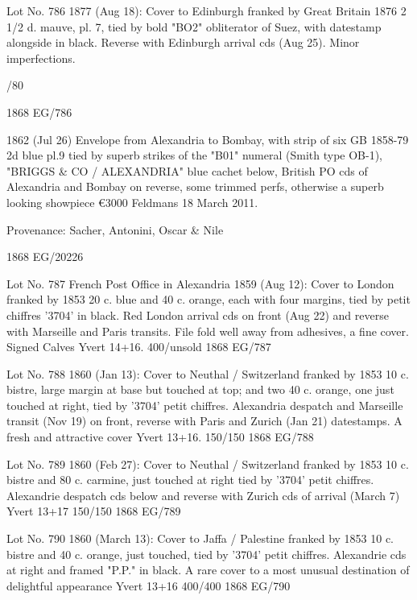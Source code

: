 \documentclass[justified]{tufte-book}
\begin{document}
%
{Lot No. 786
1877 (Aug 18): Cover to Edinburgh franked by Great Britain 1876 2 1/2 d. mauve, pl. 7, tied by bold "BO2" obliterator of Suez, with datestamp alongside in black. Reverse with Edinburgh arrival cds (Aug 25). Minor imperfections. 

/80 
}%
{1868}%
{EG/786}%
{}%
{}
{}%
{}


%
{1862 (Jul 26) Envelope from Alexandria to Bombay, with strip of six GB 1858-79 2d blue pl.9 tied by superb strikes of the "B01" numeral (Smith type OB-1), "BRIGGS \& CO / ALEXANDRIA" blue cachet below, British PO cds of Alexandria and Bombay on reverse, some trimmed perfs, otherwise a superb looking showpiece \euro 3000 Feldmans 18 March 2011.

Provenance: Sacher, Antonini, Oscar \& Nile
}%
{1868}%
{EG/20226}%
{}%
{}
{}%
{}


%
{Lot No. 787
French Post Office in Alexandria 1859 (Aug 12): Cover to London franked by 1853 20 c. blue and 40 c. orange, each with four margins, tied by petit chiffres '3704' in black. Red London arrival cds on front (Aug 22) and reverse with Marseille and Paris transits. File fold well away from adhesives, a fine cover. Signed Calves Yvert 14+16. 400/unsold
}%
{1868}%
{EG/787}%
{}%
{}
{}%
{}

%
{Lot No. 788
1860 (Jan 13): Cover to Neuthal / Switzerland franked by 1853 10 c. bistre, large margin at base but touched at top; and two 40 c. orange, one just touched at right, tied by '3704' petit chiffres. Alexandria despatch and Marseille transit (Nov 19) on front, reverse with Paris and Zurich (Jan 21) datestamps. A fresh and attractive cover Yvert 13+16. 150/150
}%
{1868}%
{EG/788}%
{}%
{}
{}%
{}

%
{Lot No. 789
1860 (Feb 27): Cover to Neuthal / Switzerland franked by 1853 10 c. bistre and 80 c. carmine, just touched at right tied by '3704' petit chiffres. Alexandrie despatch cds below and reverse with Zurich cds of arrival (March 7) Yvert 13+17 150/150
}%
{1868}%
{EG/789}%
{}%
{}
{}%
{}


%
{Lot No. 790
1860 (March 13): Cover to Jaffa / Palestine franked by 1853 10 c. bistre and 40 c. orange, just touched, tied by '3704' petit chiffres. Alexandrie cds at right and framed "P.P." in black. A rare cover to a most unusual destination of delightful appearance Yvert 13+16 400/400
}%
{1868}%
{EG/790}%
{}%
{}
{}%
{}
\end{document}
